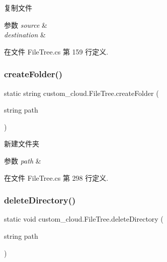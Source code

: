 复制文件 


\begin{DoxyParams}{参数}
{\em source} & \\
\hline
{\em destination} & \\
\hline
\end{DoxyParams}


在文件 File\+Tree.\+cs 第 159 行定义.

\mbox{\label{classcustom__cloud_1_1_file_tree_ade3ba6237741e061490d01a70d6dd163}} 
\subsubsection{\texorpdfstring{create\+Folder()}{createFolder()}}
{\footnotesize\ttfamily static string custom\+\_\+cloud.\+File\+Tree.\+create\+Folder (\begin{DoxyParamCaption}\item[{string}]{path }\end{DoxyParamCaption})\hspace{0.3cm}{\ttfamily [static]}}



新建文件夹 


\begin{DoxyParams}{参数}
{\em path} & \\
\hline
\end{DoxyParams}


在文件 File\+Tree.\+cs 第 298 行定义.

\mbox{\label{classcustom__cloud_1_1_file_tree_ac14fe3a408f761bd71ebcde7d3605053}} 
\subsubsection{\texorpdfstring{delete\+Directory()}{deleteDirectory()}}
{\footnotesize\ttfamily static void custom\+\_\+cloud.\+File\+Tree.\+delete\+Directory (\begin{DoxyParamCaption}\item[{string}]{path }\end{DoxyParamCaption})\hspace{0.3cm}{\ttfamily [static]}}



